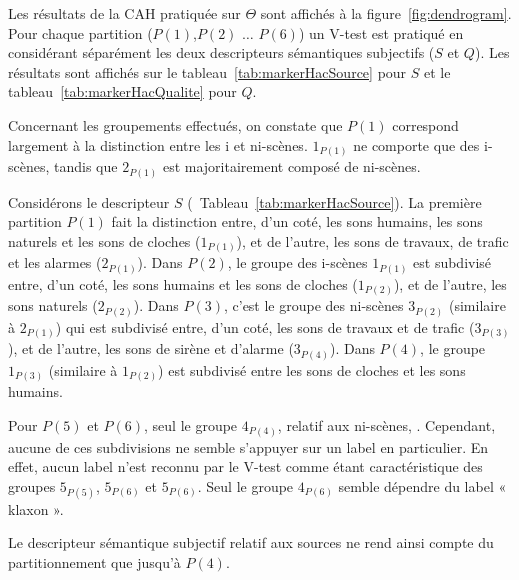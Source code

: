 Les résultats de la CAH pratiquée sur $\Theta$ sont affichés à la figure~\ref{fig:dendrogram}. Pour chaque partition ($P(1)$,$P(2)$ $\ldots$ $P(6)$) un V-test est pratiqué en considérant séparément les deux descripteurs sémantiques subjectifs ($S$ et $Q$). Les résultats sont affichés sur le tableau~\ref{tab:markerHacSource} pour $S$ et le tableau~\ref{tab:markerHacQualite} pour $Q$.

Concernant les groupements effectués, on constate que $P(1)$ correspond largement à la distinction entre les i et ni-scènes. $1_{P(1)}$ ne comporte que des i-scènes, tandis que $2_{P(1)}$ est majoritairement composé de ni-scènes.

Considérons le descripteur $S$ (\cf~Tableau~\ref{tab:markerHacSource}). La première partition $P(1)$ fait la distinction entre, d'un coté, les sons humains, les sons naturels et les sons de cloches ($1_{P(1)}$), et de l'autre, les sons de travaux, de trafic et les alarmes ($2_{P(1)}$). Dans $P(2)$, le groupe des i-scènes $1_{P(1)}$ est subdivisé entre, d'un coté, les sons humains et les sons de cloches ($1_{P(2)}$), et de l'autre, les sons naturels ($2_{P(2)}$). Dans $P(3)$, c'est le groupe des ni-scènes $3_{P(2)}$ (similaire à $2_{P(1)}$) qui est subdivisé entre, d'un coté, les sons de travaux et de trafic ($3_{P(3)}$), et de l'autre, les sons de sirène et d'alarme ($3_{P(4)}$). Dans $P(4)$, le groupe $1_{P(3)}$ (similaire à $1_{P(2)}$) est subdivisé entre les sons de cloches et les sons humains.

Pour $P(5)$ et $P(6)$, seul le groupe $4_{P(4)}$, relatif aux ni-scènes,  . Cependant, aucune de ces subdivisions ne semble s'appuyer sur un label en particulier. En effet, aucun label n'est reconnu par le V-test comme étant caractéristique des groupes $5_{P(5)}$, $5_{P(6)}$ et $5_{P(6)}$. Seul le groupe $4_{P(6)}$ semble dépendre du label « klaxon ». 

Le descripteur sémantique subjectif relatif aux sources ne rend ainsi compte du partitionnement que jusqu'à $P(4)$.

